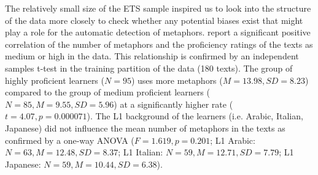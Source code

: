 \documentclass[11pt,a4paper]{article}
\begin{document}
The relatively small size of the ETS sample inspired us to look into the structure of the data more closely to check whether any potential biases exist that might play a role for the automatic detection of metaphors. \citet[p.89]{beigmanklebanov-EtAl:2018} report a significant positive correlation of the number of metaphors and the proficiency ratings of the texts as medium or high in the data. This relationship is confirmed by an independent samples t-test in the training partition of the data (180 texts). The group of highly proficient learners ($N=95$) uses more metaphors ($M=13.98, SD=8.23$) compared to the group of medium proficient learners ($N=85, M=9.55, SD=5.96$) at a significantly higher rate ($t=4.07, p=0.000071$). The L1 background of the learners (i.e. Arabic, Italian, Japanese) did not influence the mean number of metaphors in the texts as confirmed by a one-way ANOVA ($F=1.619, p=0.201$; L1 Arabic: $N=63, M=12.48, SD=8.37$; L1 Italian: $N=59, M=12.71, SD=7.79$; L1 Japanese: $N=59, M=10.44, SD=6.38$). 
\end{document}
